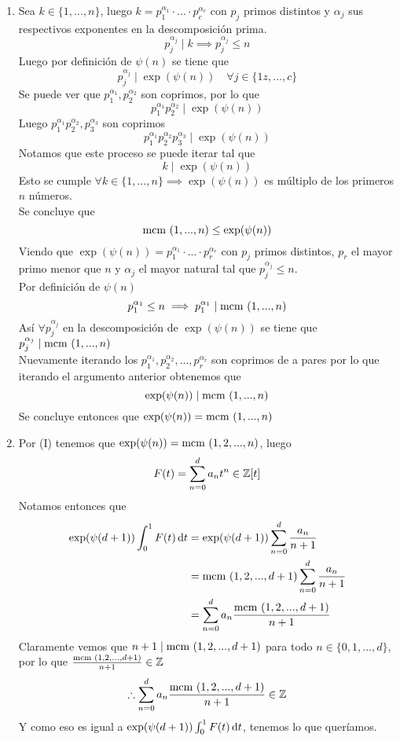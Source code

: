 \begin{sol}
	\begin{enumerate}[label = \roman*]
		\item Sea $k\in\{1,...,n\}$, luego $k=p_1^{\alpha_1}\cdot...\cdot p_c^{\alpha_c}$ con $p_j$ primos distintos y $\alpha_j$ sus respectivos exponentes en la descomposición prima.
		      \[p_j^{\alpha_j}\mid k\implies p_j^{\alpha_j}\leq n\]
		      Luego por definición de $\psi(n)$ se tiene que
		      \[p_j^{\alpha_j}\mid\exp(\psi(n))\quad\forall j\in\{1z,...,c\}\]
		      Se puede ver que $p_1^{\alpha_1},p_2^{\alpha_2}$ son coprimos, por lo que
		      \[p_1^{\alpha_1}p_2^{\alpha_2}\mid\exp(\psi(n))\]
		      Luego $p_1^{\alpha_1}p_2^{\alpha_2},p_3^{\alpha_3}$ son coprimos
		      \[p_1^{\alpha_1}p_2^{\alpha_2}p_3^{\alpha_3}\mid\exp(\psi(n))\]
		      Notamos que este proceso se puede iterar tal que
		      \[k\mid\exp(\psi(n))\]
		      Esto se cumple $\forall k\in\{1,...,n\}\implies\exp(\psi(n))$ es múltiplo de los primeros $n$ números.\\
		      Se concluye que
		      \[\text{mcm }(1,...,n)\leq\exp(\psi(n))\]
		      Viendo que $\exp(\psi(n))=p_1^{\alpha_1}\cdot...\cdot p_r^{\alpha_r}$ con $p_j$ primos distintos, $p_r$ el mayor primo menor que $n$ y $\alpha_j$ el mayor natural tal que $p_j^{\alpha_j}\leq n$.\\
		      Por definición de $\psi(n)$
		      \[p_1^{\alpha_1}\leq n\implies p_1^{\alpha_1}\mid\text{mcm }(1,...,n)\]
		      Así $\forall p_j^{\alpha_j}$ en la descomposición de $\exp(\psi(n))$ se tiene que $p_j^{\alpha_j}\mid\text{mcm }(1,...,n)$\\
		      Nuevamente iterando los $p_1^{\alpha_1},p_2^{\alpha_2},...,p_r^{\alpha_r}$ son coprimos de a pares por lo que iterando el argumento anterior obtenemos que
		      \[\exp(\psi(n))\mid\text{mcm }(1,...,n)\]
		      Se concluye entonces que $\exp(\psi(n))=\text{mcm }(1,...,n)$

		\item Por (I) tenemos que $\exp(\psi(n))=\text{mcm }(1,2,...,n)$, luego
		      \[F(t)=\sum_{n=0}^da_nt^n\in\mathbb{Z}[t]\]
		      Notamos entonces que
		      \begin{align*}
			      \exp(\psi(d+1))\int_0^1 F(t)\operatorname{d}\!{t} & =\exp(\psi(d+1))\sum_{n=0}^d\frac{a_n}{n+1}   \\
			                                        & =\text{mcm }(1,2,...,d+1)\sum_{n=0}^d\frac{a_n}{n+1} \\
			                                        & =\sum_{n=0}^da_n\frac{\text{mcm }(1,2,...,d+1)}{n+1}
		      \end{align*}
		      Claramente vemos que $n+1\mid\text{mcm }(1,2,...,d+1)$ para todo $n\in\{0,1,...,d\}$, por lo que $\frac{\text{mcm }(1,2,...,d+1)}{n+1}\in\mathbb{Z}$
		      \begin{equation*}
			      \therefore \sum_{n=0}^da_n\frac{\text{mcm }(1,2,...,d+1)}{n+1}\in\mathbb{Z}\label{eq:ii}
		      \end{equation*}
		      Y como eso es igual a $\exp(\psi(d+1))\int_0^1F(t)\operatorname{d}\!{t}$, tenemos lo que queríamos.


\end{enumerate}
\end{sol}

